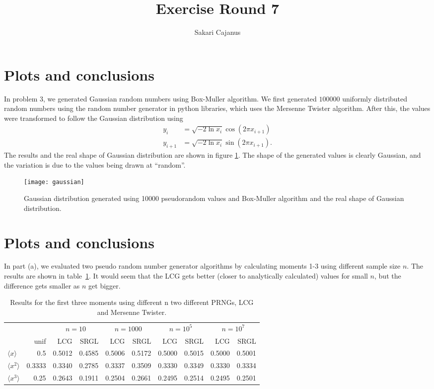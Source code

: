 \documentclass[a4paper,12pt]{scrartcl}
\author{Sakari Cajanus}
\title{Exercise Round 7}{Och samma på English}
\begin{document}
\maketitlepage
\clearpage
{}
\addtocounter{section}{2}
\section{Plots and conclusions}
In problem 3, we generated Gaussian random numbers using Box-Muller algorithm. We first generated $100 000$ uniformly distributed random numbers using the random number generator in python libraries, which uses the Mersenne Twister algorithm. After this, the values were transformed to follow the Gaussian distribution using
\begin{align*}
    y_{i} &= \sqrt{-2\ln x_{i}} \cos(2\pi x_{i+1})\\
    y_{i+1} &= \sqrt{-2\ln x_{i}} \sin(2\pi x_{i+1}).
\end{align*}
The results and the real shape of Gaussian distribution are shown in figure \ref{fig:gaussian}. The shape of the generated values is clearly Gaussian, and the variation is due to the values being drawn at ``random''.
\begin{figure}[h!]
  \centering
    \texttt{[image: gaussian]}
  \caption{Gaussian distribution generated using 10000 pseudorandom values and Box-Muller algorithm and the real shape of Gaussian distribution.}
 \label{fig:gaussian}
\end{figure}
\clearpage
\section{Plots and conclusions}
In part (a), we evaluated two pseudo random number generator algorithms by calculating moments 1-3 using different sample size $n$. The results are shown in table~\ref{tab:table}. It would seem that the LCG gets better (closer to analytically calculated) values for small $n$, but the difference gets smaller as $n$ get bigger.

\begin{table}[h!]
\caption{Results for the first three moments using different n two different PRNGs, LCG and Mersenne Twister.}
\label{tab:table}
\begin{center}
\begin{tabular}{lrrrrrrrrr}
\toprule
&& \multicolumn{2}{c}{$n=10$} & \multicolumn{2}{c}{$n=1000$} & \multicolumn{2}{c}{$n=10^5$} & \multicolumn{2}{c}{$n=10^7$} \\
\cmidrule(r){3-4} \cmidrule(r){5-6} \cmidrule(r){7-8} \cmidrule(r){9-10}
&unif & LCG & SRGL & LCG & SRGL & LCG & SRGL & LCG & SRGL\\
$\langle x\rangle$ & 0.5   & 0.5012 & 0.4585 &0.5006 &0.5172 &0.5000 & 0.5015& 0.5000 & 0.5001\\
$\langle x^2\rangle$ & 0.3333& 0.3340 & 0.2785 &0.3337 &0.3509 &0.3330 & 0.3349& 0.3330 & 0.3334\\
$\langle x^3\rangle$ & 0.25  & 0.2643 & 0.1911 &0.2504 &0.2661 &0.2495 & 0.2514& 0.2495 & 0.2501\\
\bottomrule
\end{tabular}
\end{center}
\end{table}
\end{document}
